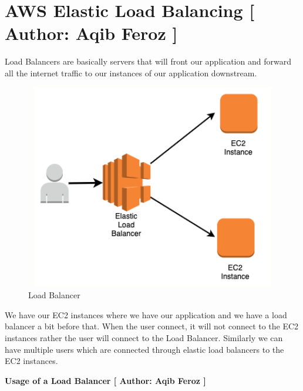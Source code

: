 \section{AWS Elastic Load Balancing [ Author: Aqib Feroz ]}

Load Balancers are basically servers that will front our application and forward all the internet traffic to our instances of our application downstream. 
\begin{figure}[h]
    \centering
    \includegraphics[scale=1.3, width=16cm, height=9cm]{images/Aqib Feroz/load-balancer.png}
    \caption{Load Balancer}
    \label{fig:my_label}
\end{figure}

We have our EC2 instances where we have our application and we have a load balancer a bit before that. When the user connect, it will not connect to the EC2 instances rather the user will connect to the Load Balancer. Similarly we can have multiple users which are connected through elastic load balancers to the EC2 instances.

\textbf{Usage of a Load Balancer [ Author: Aqib Feroz ]}


